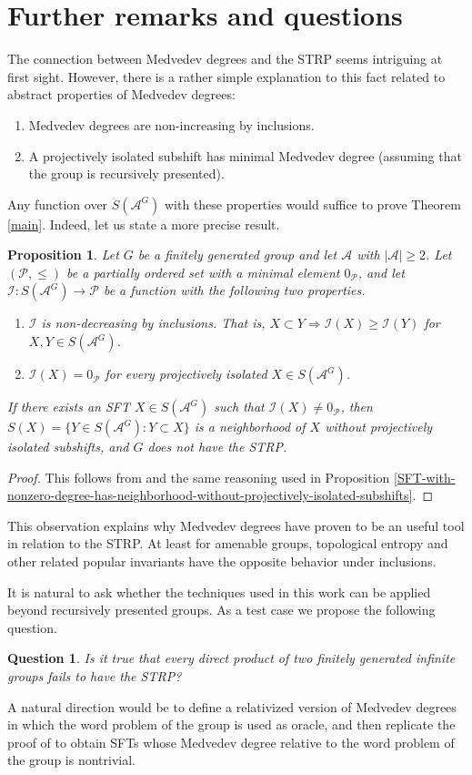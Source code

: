 \documentclass[a4paper,oneside]{amsart}
\renewcommand{\(}{\begin{dmath*}}
\renewcommand{\)}{\end{dmath*}}
\newtheorem{proposition}[theorem]{Proposition}
\newtheorem{question}[theorem]{Question}
\theoremstyle{definition}
\newcommand{\A}{\mathcal{A}}
\begin{document}
\section{Further remarks and questions}
The connection between Medvedev degrees and the STRP seems intriguing at first sight. However, there is a rather simple explanation to this fact related to abstract properties of Medvedev degrees: 
\begin{enumerate}
    \item Medvedev degrees are non-increasing by inclusions.
    \item A projectively isolated subshift has minimal Medvedev degree (assuming that the group is recursively presented). 
\end{enumerate} Any function over $S(\A^G)$ with these properties would suffice to prove  Theorem \ref{main}. Indeed, let us state a more precise result.
\begin{proposition}Let $G$ be a finitely generated group and let $\A$ with $|\A|\geq 2$. Let $(\mathcal P,\leq)$ be a partially ordered set with a minimal element $0_{\mathcal P}$, and let $\mathcal I\colon S(\A^G)\to \mathcal P$ be a function with the following two properties. 
\begin{enumerate}
    \item $\mathcal I$ is non-decreasing by inclusions. That is, $X\subset Y\Rightarrow \mathcal I(X)\geq \mathcal I(Y)$ for $X,Y\in S(\A^G)$.
    \item $\mathcal I(X)=0_{\mathcal P}$ for every projectively isolated  $X\in S(\A^G)$.
\end{enumerate} If there exists an SFT $X\in S(\A^G)$ such that $\mathcal I(X)\ne 0_{\mathcal P}$, then $S(X)=\{Y\in S(\A^G) : Y\subset X\}$ is a neighborhood of $X$ without projectively isolated subshifts, and $G$ does not have the STRP.
\end{proposition}
\begin{proof}
    This follows from \cite[Theorem A]{doucha_strong_2024} and the same reasoning used in Proposition  \ref{SFT-with-nonzero-degree-has-neighborhood-without-projectively-isolated-subshifts}.
\end{proof}
This observation explains why Medvedev degrees have proven to be an useful tool in relation to the STRP. At least for amenable groups, topological entropy and other related popular invariants have the opposite behavior under inclusions. 

It is natural to ask  whether the techniques used in this work can be applied beyond recursively presented groups. As a test case we propose the following question.
\begin{question}
Is it true that every direct product of two finitely generated infinite groups fails to have the STRP? 
\end{question}A natural direction would be to define a relativized version of Medvedev degrees in which the word problem of the group is used as oracle, and then replicate the proof of \cite[Theorem 5.6]{barbieri_medvedev_2024} to obtain SFTs  whose Medvedev degree relative to the word problem of the group is nontrivial. 
\end{document}
